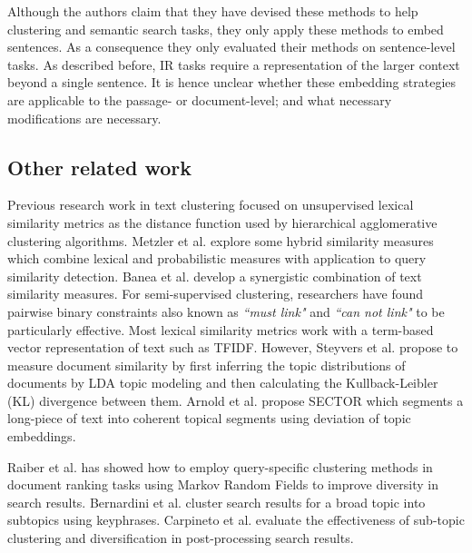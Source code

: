 Although the authors claim that they have devised these methods to help clustering and semantic search tasks, they only apply these methods to embed sentences. As a consequence they  only evaluated their methods on sentence-level tasks. As described before, IR tasks require a representation of the larger context beyond a single sentence. It is hence unclear whether these embedding strategies are applicable to the  passage- or document-level;  and what necessary modifications are necessary.

\subsection{Other related work} Previous research work in text clustering\cite{kulis2009semi,bilenko2004integrating,davidson2008finding,basu2004probabilistic,basu2002semi,gomaa2013survey} focused on unsupervised lexical similarity metrics as the distance function used by hierarchical agglomerative clustering algorithms. Metzler et al.\cite{metzler2007similarity} explore some hybrid similarity measures which combine lexical and probabilistic measures with application to query similarity detection. Banea et al.\cite{banea2012unt} develop a synergistic combination of text similarity measures. For semi-supervised clustering, researchers have found pairwise binary constraints also known as \textit{``must link"} and \textit{``can not link"} to be particularly effective. Most lexical similarity metrics work with a term-based vector representation of text such as TFIDF. However, Steyvers et al.\cite{steyvers2007probabilistic} propose to measure document similarity by first inferring the topic distributions of documents by LDA\cite{blei2003latent} topic modeling and then calculating the Kullback-Leibler (KL) divergence between them. Arnold et al. propose SECTOR \cite{arnold2019sector} which segments a long-piece of text into coherent topical segments using deviation of topic embeddings.

Raiber et al. \cite{raiber2013ranking} has showed how to employ query-specific clustering methods in document ranking tasks using Markov Random Fields to improve diversity in search results. Bernardini et al. \cite{bernardini2009full} cluster search results for a broad topic into subtopics using keyphrases. Carpineto et al. \cite{carpineto2012evaluating} evaluate the effectiveness of sub-topic clustering and diversification in post-processing search results.

